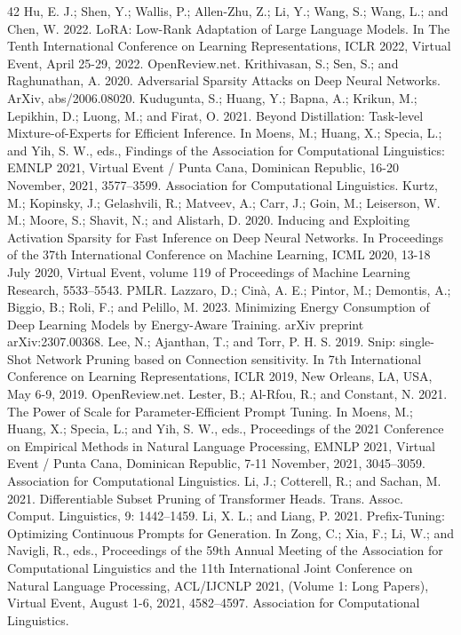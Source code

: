 \documentclass[10pt,twocolumn]{article}
\begin{document}
\begin{thebibliography}{42}
 Hu, E. J.; Shen, Y.; Wallis, P.; Allen-Zhu, Z.; Li, Y.; Wang, S.; Wang, L.; and Chen, W. 2022. LoRA: Low-Rank Adaptation of Large Language Models. In The Tenth International Conference on Learning Representations, ICLR 2022, Virtual Event, April 25-29, 2022. OpenReview.net.
 Krithivasan, S.; Sen, S.; and Raghunathan, A. 2020. Adversarial Sparsity Attacks on Deep Neural Networks. ArXiv, abs/2006.08020.
 Kudugunta, S.; Huang, Y.; Bapna, A.; Krikun, M.; Lepikhin, D.; Luong, M.; and Firat, O. 2021. Beyond Distillation: Task-level Mixture-of-Experts for Efficient Inference. In Moens, M.; Huang, X.; Specia, L.; and Yih, S. W., eds., Findings of the Association for Computational Linguistics: EMNLP 2021, Virtual Event / Punta Cana, Dominican Republic, 16-20 November, 2021, 3577–3599. Association for Computational Linguistics.
 Kurtz, M.; Kopinsky, J.; Gelashvili, R.; Matveev, A.; Carr, J.; Goin, M.; Leiserson, W. M.; Moore, S.; Shavit, N.; and Alistarh, D. 2020. Inducing and Exploiting Activation Sparsity for Fast Inference on Deep Neural Networks. In Proceedings of the 37th International Conference on Machine Learning, ICML 2020, 13-18 July 2020, Virtual Event, volume 119 of Proceedings of Machine Learning Research, 5533–5543. PMLR.
 Lazzaro, D.; Cinà, A. E.; Pintor, M.; Demontis, A.; Biggio, B.; Roli, F.; and Pelillo, M. 2023. Minimizing Energy Consumption of Deep Learning Models by Energy-Aware Training. arXiv preprint arXiv:2307.00368.
 Lee, N.; Ajanthan, T.; and Torr, P. H. S. 2019. Snip: single-Shot Network Pruning based on Connection sensitivity. In 7th International Conference on Learning Representations, ICLR 2019, New Orleans, LA, USA, May 6-9, 2019. OpenReview.net.
 Lester, B.; Al-Rfou, R.; and Constant, N. 2021. The Power of Scale for Parameter-Efficient Prompt Tuning. In Moens, M.; Huang, X.; Specia, L.; and Yih, S. W., eds., Proceedings of the 2021 Conference on Empirical Methods in Natural Language Processing, EMNLP 2021, Virtual Event / Punta Cana, Dominican Republic, 7-11 November, 2021, 3045–3059. Association for Computational Linguistics.
 Li, J.; Cotterell, R.; and Sachan, M. 2021. Differentiable Subset Pruning of Transformer Heads. Trans. Assoc. Comput. Linguistics, 9: 1442–1459.
 Li, X. L.; and Liang, P. 2021. Prefix-Tuning: Optimizing Continuous Prompts for Generation. In Zong, C.; Xia, F.; Li, W.; and Navigli, R., eds., Proceedings of the 59th Annual Meeting of the Association for Computational Linguistics and the 11th International Joint Conference on Natural Language Processing, ACL/IJCNLP 2021, (Volume 1: Long Papers), Virtual Event, August 1-6, 2021, 4582–4597. Association for Computational Linguistics.

\end{thebibliography}
\end{document}
